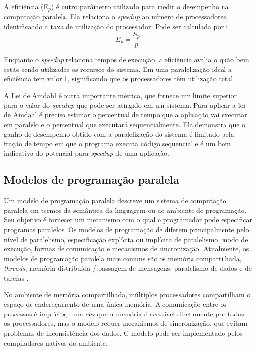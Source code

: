 A eficiência (E$_p$) é outro parâmetro utilizado para medir o desempenho na computação paralela.  Ela relaciona o \textit{speedup} ao número de processadores, identificando a taxa de utilização do processador. Pode ser calculada por \cite{Rauber:2010}: 
 \[ E_p = \frac{S_p}{p} \]
 
Enquanto o \textit{speedup} relaciona tempos de execução, a eficiência avalia o quão bem estão sendo utilizados os recursos do sistema. Em uma paralelização ideal a eficiência tem valor 1, significando que os processadores têm utilização total.
		
A Lei de Amdahl é outra importante métrica, que fornece um limite superior para o valor do \textit{speedup} que pode ser atingido em um sistema. Para aplicar a lei de Amdahl é preciso estimar o percentual de tempo que a aplicação vai executar em paralelo e   o percentual que executará sequencialmente. 
Ela demonstra que o ganho de desempenho obtido com a paralelização do sistema é limitado pela fração de tempo em que o programa executa código sequencial e é um bom indicativo do potencial para \textit{speedup} de uma aplicação.


\subsection{Modelos de programação paralela}

Um modelo de programação paralela descreve um sistema de computação paralela em termos da semântica da linguagem ou do ambiente de programação. Seu objetivo é fornecer um mecanismo com o qual o programador pode especificar programas paralelos. Os modelos de programação de diferem principalmente pelo nível de paralelismo, especificação explícita ou implícita de paralelismo, modo de execução, formas de comunicação e mecanismos de sincronização. Atualmente, os modelos de programação paralela mais comuns são os memória compartilhada, \textit{threads}, memória distribuída / passagem de mensagens, paralelismo de dados e de tarefas \cite{Rauber:2010}.
 


No ambiente de memória compartilhada, múltiplos processadores compartilham o espaço de endereçamento de uma única memória. A comunicação entre os processos é implícita, uma vez que a memória é acessível diretamente por todos os processadores, mas o modelo requer mecanismos de sincronização, que evitam problemas de inconsistência dos dados. O modelo pode ser implementado pelos compiladores nativos do ambiente.

